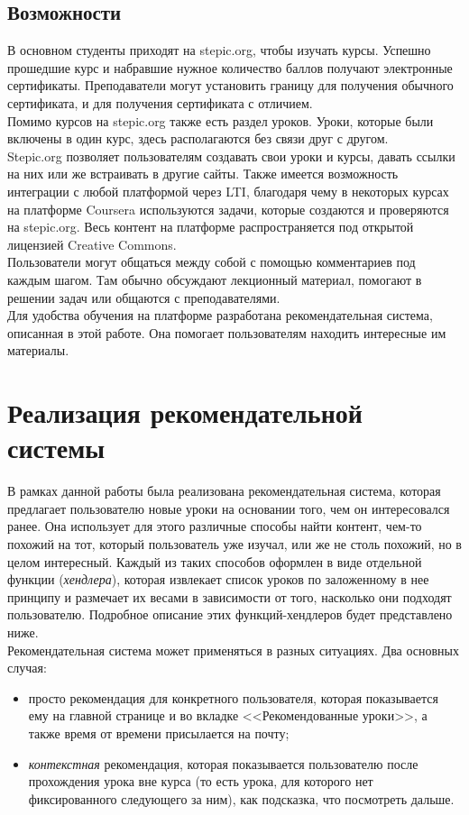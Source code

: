 \documentclass[14pt]{matmex-diploma}
\begin{document}
\subsection{Возможности}
\indent В основном студенты приходят на stepic.org, чтобы изучать курсы. Успешно прошедшие курс и набравшие нужное количество баллов получают электронные сертификаты. Преподаватели могут установить границу для получения обычного сертификата, и для получения сертификата с отличием.
\\\indent Помимо курсов на stepic.org также есть раздел уроков. Уроки, которые были включены в один курс, здесь располагаются без связи друг с другом. 
\\\indent Stepic.org позволяет пользователям создавать свои уроки и курсы, давать ссылки на них или же встраивать в другие сайты. Также имеется возможность интеграции с любой платформой через LTI, благодаря чему в некоторых курсах на платформе Coursera\cite{coursera} используются задачи, которые создаются и проверяются на stepic.org. Весь контент на платформе распространяется под открытой лицензией Creative Commons\cite{creativecommons}.
\\\indent Пользователи могут общаться между собой с помощью комментариев под каждым шагом. Там обычно обсуждают лекционный материал, помогают в решении задач или общаются с преподавателями.
\\\indent Для удобства обучения на платформе разработана рекомендательная система, описанная в этой работе. Она помогает пользователям находить интересные им материалы.


\section{Реализация рекомендательной системы}
\indent В рамках данной работы была реализована рекомендательная система, которая предлагает пользователю новые уроки на основании того, чем он интересовался ранее. Она использует для этого различные способы найти контент, чем-то похожий на тот, который пользователь уже изучал, или же не столь похожий, но в целом интересный. Каждый из таких способов оформлен в виде отдельной функции (\textit{хендлера}), которая извлекает список уроков по заложенному в нее принципу и размечает их весами в зависимости от того, насколько они подходят пользователю. Подробное описание этих функций-хендлеров будет представлено ниже.
\\\indent Рекомендательная система может применяться в разных ситуациях. Два основных случая:
\begin{itemize}
    \item просто рекомендация для конкретного пользователя, которая показывается ему на главной странице и во вкладке <<Рекомендованные уроки>>, а также время от времени присылается на почту;
    \item \textit{контекстная} рекомендация, которая показывается пользователю после прохождения урока вне курса (то есть урока, для которого нет фиксированного следующего за ним), как подсказка, что посмотреть дальше.
\end{itemize}
\end{document}
